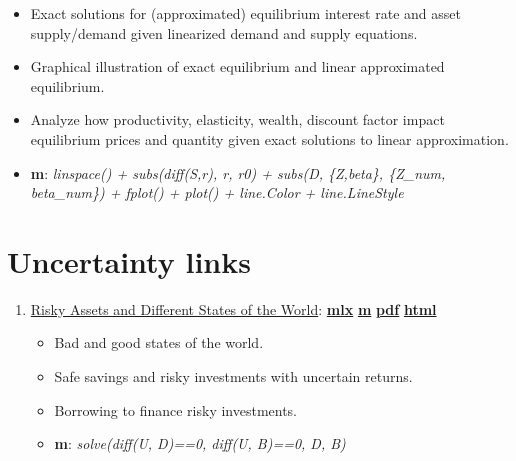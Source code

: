 \documentclass[
]{book}
\providecommand{\tightlist}{%
  \setlength{\itemsep}{0pt}\setlength{\parskip}{0pt}}
\begin{document}
\begin{enumerate}
  \begin{itemize}
  \tightlist
  \item
    Exact solutions for (approximated) equilibrium interest rate and asset supply/demand given linearized demand and supply equations.
  \item
    Graphical illustration of exact equilibrium and linear approximated equilibrium.
  \item
    Analyze how productivity, elasticity, wealth, discount factor impact equilibrium prices and quantity given exact solutions to linear approximation.
  \item
    \textbf{m}: \emph{linspace() + subs(diff(S,r), r, r0) + subs(D, \{Z,beta\}, \{Z\_num, beta\_num\}) + fplot() + plot() + line.Color + line.LineStyle}
  \end{itemize}
\end{enumerate}

\hypertarget{uncertainty-links}{%
\section{Uncertainty links}\label{uncertainty-links}}

\begin{enumerate}
\def\labelenumi{\arabic{enumi}.}
\tightlist
\item
  \href{https://fanwangecon.github.io/Math4Econ/uncertainty/htmlpdfm/RiskyAsset.html}{Risky Assets and Different States of the World}: \href{https://github.com/FanWangEcon/Math4Econ/blob/master/uncertainty/RiskyAsset.mlx}{\textbf{mlx}} \textbar{} \href{https://github.com/FanWangEcon/Math4Econ/blob/master/uncertainty/htmlpdfm/RiskyAsset.m}{\textbf{m}} \textbar{} \href{https://github.com/FanWangEcon/Math4Econ/blob/master/uncertainty/htmlpdfm/RiskyAsset.pdf}{\textbf{pdf}} \textbar{} \href{https://fanwangecon.github.io/Math4Econ/uncertainty/htmlpdfm/RiskyAsset.html}{\textbf{html}}

  \begin{itemize}
  \tightlist
  \item
    Bad and good states of the world.
  \item
    Safe savings and risky investments with uncertain returns.
  \item
    Borrowing to finance risky investments.
  \item
    \textbf{m}: \emph{solve(diff(U, D)==0, diff(U, B)==0, D, B)}
  \end{itemize}
\end{enumerate}
\end{document}
